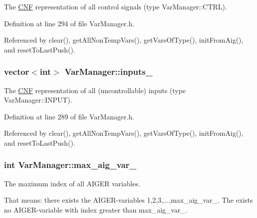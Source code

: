 The \hyperlink{classCNF}{C\-N\-F} representation of all control signals (type Var\-Manager\-::\-C\-T\-R\-L). 



Definition at line 294 of file Var\-Manager.\-h.



Referenced by clear(), get\-All\-Non\-Temp\-Vars(), get\-Vars\-Of\-Type(), init\-From\-Aig(), and reset\-To\-Last\-Push().

\hypertarget{classVarManager_a04609c1f6a3c87c10abcfbd3850a2f87}{
\subsubsection[{inputs\-\_\-}]{\setlength{\rightskip}{0pt plus 5cm}vector$<$int$>$ Var\-Manager\-::inputs\-\_\-\hspace{0.3cm}{\ttfamily [protected]}}}\label{classVarManager_a04609c1f6a3c87c10abcfbd3850a2f87}


The \hyperlink{classCNF}{C\-N\-F} representation of all (uncontrollable) inputs (type Var\-Manager\-::\-I\-N\-P\-U\-T). 



Definition at line 289 of file Var\-Manager.\-h.



Referenced by clear(), get\-All\-Non\-Temp\-Vars(), get\-Vars\-Of\-Type(), init\-From\-Aig(), and reset\-To\-Last\-Push().

\hypertarget{classVarManager_af5877424c2c4ef563bd3278f85dd3c2d}{
\subsubsection[{max\-\_\-aig\-\_\-var\-\_\-}]{\setlength{\rightskip}{0pt plus 5cm}int Var\-Manager\-::max\-\_\-aig\-\_\-var\-\_\-\hspace{0.3cm}{\ttfamily [protected]}}}\label{classVarManager_af5877424c2c4ef563bd3278f85dd3c2d}


The maximum index of all A\-I\-G\-E\-R variables. 

That means\-: there exists the A\-I\-G\-E\-R-\/variables 1,2,3,...,max\-\_\-aig\-\_\-var\-\_\-. The exists no A\-I\-G\-E\-R-\/variable with index greater than max\-\_\-aig\-\_\-var\-\_\-. 

